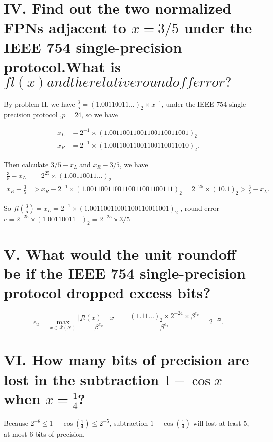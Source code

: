 \documentclass[twoside,a4paper]{article}
\begin{document}
\section*{IV. \small{Find out the two normalized FPNs adjacent to $x=3/5$ under the IEEE 754 single-precision protocol.What is $fl\left( x \right) and the relative roundoff error?$}}
By problem II, we have $\frac{3}{5}=\left( 1.00110011\ldots \right)_{2}\times x^{-1}$, under the IEEE 754 single-precision protocol
,$p=24$, so we have

\begin{equation*}
	\begin{split}
		x_L&=2^{-1}\times \left( 1.00110011001100110011001 \right)_2\\
		x_R&=2^{-1}\times \left( 1.00110011001100110011010 \right)_2. 
	\end{split}	
\end{equation*}

Then calculate $3/5-x_L$ and $x_R-3/5$, we have
 \begin{equation*}
	 \begin{split}
		 \frac{3}{5}-x_L&=2^{25}\times \left( 1.00110011\ldots \right)_2\\
		 x_R-\frac{3}{5}&>x_R-2^{-1}\times \left( 1.0011001100110011001100111 \right)_2
		 =2^{-25}\times \left( 10.1 \right)_2>\frac{3}{5}-x_L. 	
	 \end{split}
\end{equation*}

 So $fl\left( \frac{3}{5} \right)=x_L=2^{-1}\times \left( 1.00110011001100110011001 \right)_2  $ 
, round error $e=2^{-25}\times \left( 1.00110011\ldots \right)_2=2^{-25}\times 3/5$. 

\section*{V. \small{What would the unit roundoff be if the IEEE 754 single-precision protocol dropped excess bits?}}
\[
	\epsilon_u=\max_{x\in\mathcal{R}\left( \mathcal{F} \right)}\frac{ \mid  fl\left( x \right)-x \mid }{\beta^{e_x}}
	=\frac{\left( 1.11\ldots \right)_2\times 2^{-24}\times \beta^{e_x} }{\beta^{e_x}}=2^{-23}
.\] 

\section*{VI. \small{How many bits of precision are lost in the subtraction $1-\cos x$ when $x=\frac{1}{4}$?}}
Because $2^{-6}\le 1-\cos\left( \frac{1}{4} \right) \le 2^{-5}$, subtraction $1-\cos\left( \frac{1}{4} \right) $ will lost at least 5, at most 6 bits of precision.
\end{document}
